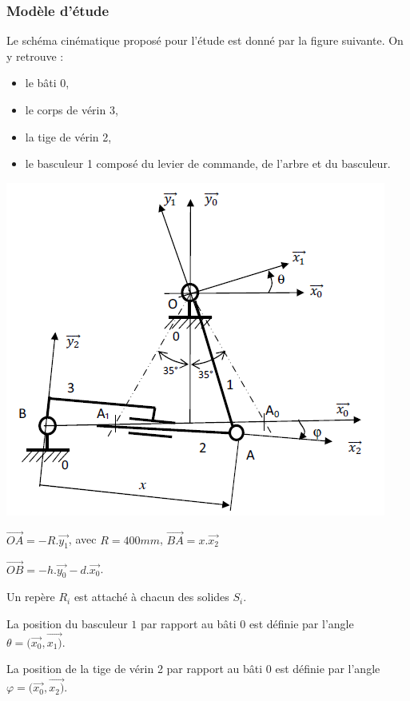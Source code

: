 \subsubsection{Modèle d'étude}
Le schéma cinématique proposé pour l'étude est donné par la figure suivante. On y retrouve :
\begin{itemize}
 \item le bâti 0,
 \item le corps de vérin 3,
 \item la tige de vérin 2,
 \item le basculeur 1 composé du levier de commande, de l'arbre et du basculeur.
\end{itemize}

\begin{minipage}{0.6\linewidth}
	\includegraphics[width=0.9\linewidth]{img/Annexe3}
\end{minipage}
\hfill
\begin{minipage}{0.35\linewidth}
$\overrightarrow{OA}=-R.\overrightarrow{y_1}$, avec $R=400mm$, $\overrightarrow{BA}=x.\overrightarrow{x_2}$

$\overrightarrow{OB}=-h.\overrightarrow{y_0}-d.\overrightarrow{x_0}$.
\end{minipage}

Un repère $R_i$ est attaché à chacun des solides $S_i$.

La position du basculeur $1$ par rapport au bâti $0$ est définie par l'angle $\theta=(\overrightarrow{x_0},\overrightarrow{x_1)}$.

La position de la tige de vérin 2 par rapport au bâti 0 est définie par l'angle $\varphi=(\overrightarrow{x_0},\overrightarrow{x_2)}$.

